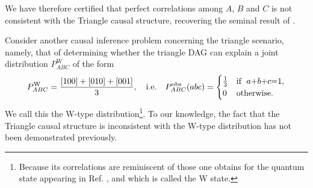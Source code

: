 We have therefore certified that perfect correlations among $A$, $B$ and $C$ is not consistent with the Triangle causal structure, recovering the seminal result of \citet{steudel2010ancestors}.




\par\smallskip\nobreak

Consider another causal inference problem concerning the triangle scenario, namely, that of determining whether the triangle DAG can explain a joint distribution $P^{\text{W}}_{A B C}$ of the form
\begin{align}\label{eq:wdistribution1}
P^{\text{W}}_{A B C}=\frac{[100]+[010]+[001]}{3},\quad\text{i.e.}\quad P^{\text{obs}}_{A B C}(a b c)=\begin{cases}\tfrac{1}{3}&\text{if }\; a\mathord{+}b\mathord{+}c\mathord{=} 1, \\ 0&\text{otherwise}.\end{cases}
\end{align}
We call this the W-type distribution\footnote{Because its correlations are reminiscent of those one obtains for the quantum state appearing in Ref. \cite{3Qubits2Ways}, and which is called the W state.}. To our knowledge, the fact that the Triangle causal structure is inconsistent with the W-type distribution has not been demonstrated previously.

